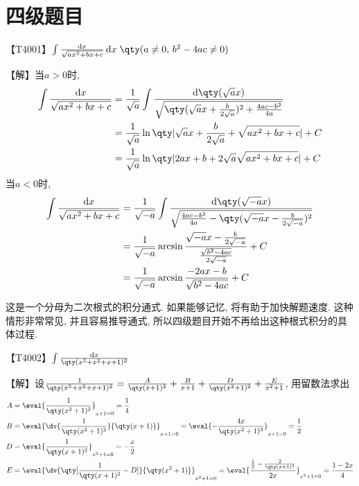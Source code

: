 \documentclass{ctexbook}
\newcommand*{\dif}{\mathop{}\!\mathrm{d}}
\begin{document}
{\chapter*{四级题目}
【T4001】$\int\frac{\dif{x}}{\sqrt{ax^{2}+bx+c}}\dif{x}\;\qty(a\ne0,\,b^{2}-4ac\ne0)$\par
【解】当$a>0$时, 
\begin{align*}
\int\frac{\dif{x}}{\sqrt{ax^{2}+bx+c}}={}&\frac{1}{\sqrt{a}}\int\frac{\dif{\qty(\sqrt{a}x)}}{\sqrt{\qty(\sqrt{a}x+\frac{b}{2\sqrt{a}})^{2}+\frac{4ac-b^{2}}{4a}}}\\
={}&\frac{1}{\sqrt{a}}\ln\qty|\sqrt{a}x+\frac{b}{2\sqrt{a}}+\sqrt{ax^{2}+bx+c}|+C\\
={}&\frac{1}{\sqrt{a}}\ln\qty|2ax+b+2\sqrt{a}\sqrt{ax^{2}+bx+c}|+C\\
\end{align*}
当$a<0$时, 
\begin{align*}
\int\frac{\dif{x}}{\sqrt{ax^{2}+bx+c}}={}&\frac{1}{\sqrt{-a}}\int\frac{\dif{\qty(\sqrt{-a}x)}}{\sqrt{\frac{4ac-b^{2}}{4a}-\qty(\sqrt{-a}x-\frac{b}{2\sqrt{-a}})^{2}}}\\
={}&\frac{1}{\sqrt{-a}}\arcsin{\frac{\sqrt{-a}x-\frac{b}{2\sqrt{-a}}}{\frac{\sqrt{b^{2}-4ac}}{2\sqrt{-a}}}}+C\\
={}&\frac{1}{\sqrt{-a}}\arcsin{\frac{-2ax-b}{\sqrt{b^{2}-4ac}}}+C
\end{align*}\par
{\kaishu 这是一个分母为二次根式的积分通式. 如果能够记忆, 将有助于加快解题速度. 这种情形非常常见, 并且容易推导通式, 所以四级题目开始不再给出这种根式积分的具体过程. \par}
【T4002】$\int\frac{\dif{x}}{\qty(x^{3}+x^{2}+x+1)^{2}}$\par
【解】设$\frac{1}{\qty(x^{3}+x^{2}+x+1)^{2}}=\frac{A}{\qty(x+1)^{2}}+\frac{B}{x+1}+\frac{D}{\qty(x^{2}+1)^{2}}+\frac{E}{x^{2}+1}$, 用留数法求出
\begin{align*}
A={}&\eval{\frac{1}{\qty(x^{2}+1)^{2}}}_{x+1=0}=\frac{1}{4}\\
B={}&\eval{\dv{\frac{1}{\qty(x^{2}+1)^{2}}}{\qty(x+1)}}_{x+1=0}=\eval{-\frac{4x}{\qty(x^{2}+1)^{3}}}_{x+1=0}=\frac{1}{2}\\
D={}&\eval{\frac{1}{\qty(x+1)^{2}}}_{x^{2}+1=0}=-\frac{x}{2}\\
E={}&\eval{\dv{\qty[\frac{1}{\qty(x+1)^{2}}-D]}{\qty(x^{2}+1)}}_{x^{2}+1=0}=\eval{\frac{\frac{1}{2}-\frac{2}{\qty(x+1)^{3}}}{2x}}_{x^{2}+1=0}=\frac{1-2x}{4}
\end{align*}
}
\end{document}
